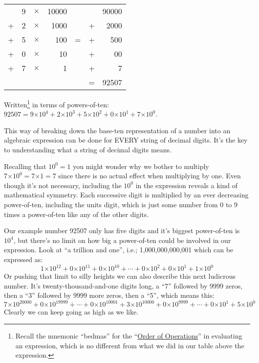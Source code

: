 \documentclass{article}
\begin{document}
\begin{center}
\begin{tabular}{r r r r c r r}
\phantom & 9 & $\times$ & 10000 & \phantom & \phantom & 90000\\
+ & 2 & $\times$ & 1000 & \phantom & + & 2000\\
+ & 5 & $\times$ & 100 & \; \; \; = \; \; \; & + & 500\\
+ & 0 & $\times$ & 10 & \phantom & + & 00\\
+ & 7 & $\times$ & 1 & \phantom & + & 7\\
\cline{6-7}
\phantom & \phantom & \phantom & \phantom & \phantom & = & 92507
\end{tabular}
\end{center}

Written\footnote{Recall the mnemonic ``bedmas'' for
the ``\href{https://en.wikipedia.org/wiki/Order_of_operations}{Order of Operations}'' in
evaluating an expression, which is no different from
what we did in our table above the expression.}
in terms of powers-of-ten:
$92507=9{\times{}}10^4+2{\times{}}10^3+5{\times{}}10^2+0{\times{}}10^1+7{\times{}}10^0$.

This way of breaking down the base-ten representation of a number into
an algebraic expression can be done for EVERY string of decimal digits. It's the key to 
understanding what a string of decimal digits means.

Recalling that $10^0 = 1$ you might wonder why we bother to multiply
$7{\times{}}10^0=7{\times{}}1=7$ since there is no actual effect
when multiplying by one.
Even though it's not necessary, including the $10^0$ in the
expression reveals a kind of mathematical symmetry.
Each successive digit is multiplied by an ever
decreasing power-of-ten, including
the units digit,
which is just some number from 0 to 9 times a power-of-ten
like any of the other digits.

Our example number 92507 only has five digits and it's biggest power-of-ten is $10^4$,
but there's
no limit on how big a power-of-ten could be involved in our expression.
Look at ``a trillion and one'', i.e.; 1,000,000,000,001 which can be expressed as:
\[1{\times{}}10^{12}+0{\times{}}10^{11}+0{\times{}}10^{10}+\cdots{}+0{\times{}}10^{2}+0{\times{}}10^{1}+1{\times{}}10^{0}\]
%
Or pushing that limit to silly heights we can also describe this next ludicrous number.
It's twenty-thousand-and-one digits long, a
``7'' followed by 9999 zeros, then a ``3''
followed by 9999 more zeros, then a ``5'', which means this:
\[
7{\times{}}10^{20000}+0{\times{}}10^{19999}+\cdots{}+0{\times{}}10^{10001}+3{\times{}}10^{10000}+0{\times{}}10^{9999}+\cdots{}+0{\times{}}10^{1}+5{\times{}}10^{0}\]
Clearly we can keep going as high as we like.
\end{document}
